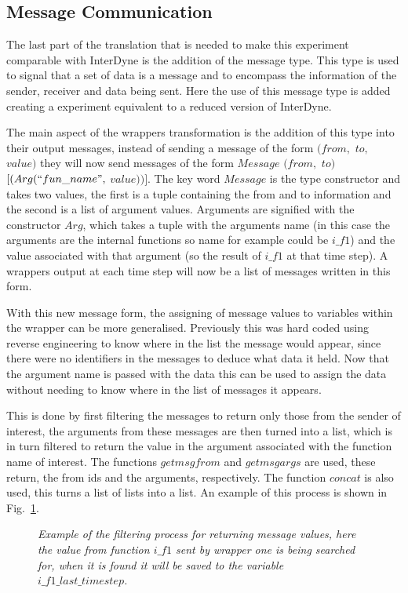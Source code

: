 \documentclass{article}
\begin{document}
\subsection{Message Communication}
The last part of the translation that is needed to make this experiment comparable with InterDyne is the addition of the message type. This type is used to signal that a set of data is a message and to encompass  the information of the sender, receiver and data being sent. Here the use of this message type is added creating a experiment equivalent to a reduced version of InterDyne.   

The main aspect of the wrappers transformation is the addition of this type into their output messages, instead of sending a message of the form $(from,$ $to,$ $value)$ they will now send messages of the form  $Message$ $(from,$ $to)$ $[(Arg(``fun\_name",$ $value))]$. The key word $Message$ is the type constructor and takes two values, the first is a tuple containing the from and to information and the second is a list of argument values. Arguments are signified with the constructor $Arg$, which takes a tuple with the arguments name (in this case the arguments are the internal functions so  name for example could be $i\_f1$)  and the value associated with that argument (so the result of $i\_f1$ at that time step). A wrappers output at each time step will now be a list of messages written in this form. 

With this new message form, the assigning of message values to variables within the wrapper can be more generalised. Previously this was hard coded using reverse engineering to know where in the list the message would appear, since there were no identifiers in the messages to deduce what data it held. Now that the argument name is passed with the data this can be used to assign the data without needing to know where in the list of messages it appears. 


This is done by first filtering the messages to return only those from the sender of interest, the arguments from these messages are then turned into a list, which is in turn filtered to return the value in the argument associated with the function name of interest. The functions $getmsgfrom$ and $getmsgargs$ are used, these return, the from ids and the arguments, respectively. The function $concat$ is also used, this turns a list of lists into a list. An example of this process is shown in Fig.~\ref{fig:filter8}. 
\begin{figure}[H]
	\centering
	
	\caption{\it Example of the filtering process for returning message values, here the value from function $i\_f1$ sent by wrapper one is being searched for, when it is found it will be saved to the variable $i\_f1\_last\_timestep$.}
	\label{fig:filter8}
\end{figure} 
\end{document}
